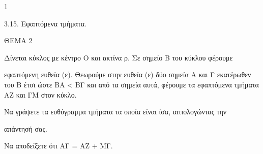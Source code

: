\begin{ylh}{1}
    \item 3.15. Εφαπτόμενα τμήματα.
\end{ylh}

ΘΕΜΑ 2

Δίνεται κύκλος με κέντρο Ο και ακτίνα ρ. Σε σημείο Β του κύκλου φέρουμε

εφαπτόμενη ευθεία (ε). Θεωρούμε στην ευθεία (ε) δύο σημεία Α και Γ εκατέρωθεν του Β έτσι ώστε ΒΑ \textless{} ΒΓ και από τα σημεία αυτά, φέρουμε τα εφαπτόμενα τμήματα ΑΖ και ΓΜ στον κύκλο.

\begin{alist}
\item Να γράψετε τα ευθύγραμμα τμήματα τα οποία είναι ίσα, αιτιολογώντας την

απάντησή σας. 

\item Να αποδείξετε ότι ΑΓ = ΑΖ + ΜΓ. 


\begin{center}
\end{center}
\end{alist}
